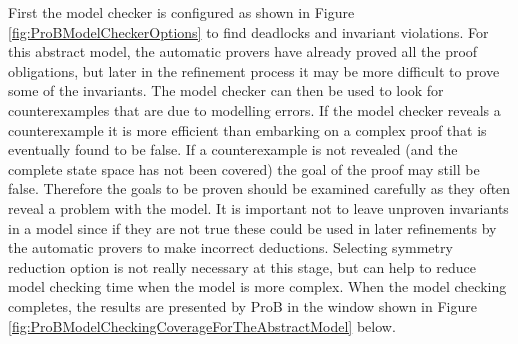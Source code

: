 First the model checker is configured as shown in Figure \ref{fig:ProBModelCheckerOptions} to find deadlocks and invariant violations. For this abstract model, the automatic provers have already proved all the proof obligations, but later in the refinement process it may be more difficult to prove some of the invariants. The model checker can then be used to look for counterexamples that are due to modelling errors. If the model checker reveals a counterexample it is more efficient than embarking on a complex proof that is eventually found to be false. If a counterexample is not revealed (and the complete state space has not been covered) the goal of the proof may still be false. Therefore the goals to be proven should be examined carefully as they often reveal a problem with the model. 
It is important not to leave unproven invariants in a model since if they are not true these could be used in later refinements by the automatic provers to make incorrect deductions.
Selecting symmetry reduction option is not really necessary at this stage, but can help to reduce model checking time when the model is more complex.
When the model checking completes, the results are presented by ProB in the window shown in Figure \ref{fig:ProBModelCheckingCoverageForTheAbstractModel} below.
 
